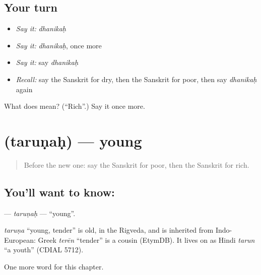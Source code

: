 \subsection*{Your turn}
\begin{itemize}
\raggedright
  \item \emph{Say it:} \emph{dhanikaḥ}
  \item \emph{Say it:} \emph{dhanikaḥ}, once more
  \item \emph{Say it:} say \emph{dhanikaḥ}
  \item \emph{Recall:} say the Sanskrit for dry, then the Sanskrit for poor, then say \emph{dhanikaḥ} again
\end{itemize}

\begin{tcolorbox}[breakable,colback=teal!4,colframe=teal!35!black,title={Before you move on}]
What does  mean? (\textquotedblleft{}Rich\textquotedblright{}.) Say it once more.
\end{tcolorbox}
\section[\texorpdfstring{\sk{तरुणः} (taruṇaḥ)}{तरुणः (taruṇaḥ)}]{ (taruṇaḥ) — young}

\label{lesson:SA-C127-tarunah}



\begin{quote}
Before the new one: say the Sanskrit for poor, then the Sanskrit for rich.
\end{quote}

\subsection*{You'll want to know: }
\textbf{} — \emph{taruṇaḥ} — \textquotedblleft{}young\textquotedblright{}.

\begin{cousinweb}
\emph{taruṇa} \textquotedblleft{}young, tender\textquotedblright{} is old, in the Rigveda, and is inherited from Indo-European: Greek \emph{terēn} \textquotedblleft{}tender\textquotedblright{} is a cousin (EtymDB). It lives on as Hindi \emph{tarun} \textquotedblleft{}a youth\textquotedblright{} (CDIAL 5712).
\end{cousinweb}

\begin{grammarlens}[title={What you've built}]
One more word for this chapter.
\end{grammarlens}

